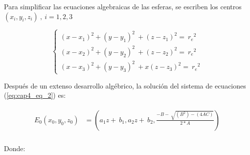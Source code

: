     \vspace{-3.5em}

    Para simplificar las ecuaciones algebraicas de las esferas, se escriben los centros $\left(x_i,y_i,z_i\right)\ ,\ i=1,2,3$
    
        \vspace{-1em}

    
    \begin{equation}
    \left\lbrace
    \begin{array}{ll}
    {\left(x-x_1\right)}^2+{\left(y-y_1\right)}^2\ +{\left(z-z_1\right)}^2=\ {r_e}^2\  \\ 
    {\left(x-x_2\right)}^2+{\left(y-y_2\right)}^2\ +{\left(z-z_2\right)}^2=\ {r_e}^2 \\ 
    {\left(x-x_3\right)}^2+{\left(y-y_3\right)}^2\ +{x\left(z-z_3\right)}^2=\ {r_e}^2
    \end{array}
    \right.
    \label{eq:cap4_eq_2}
    \end{equation}


    Despu\'{e}s de un extenso desarrollo alg\'{e}brico, la soluci\'{o}n del sistema de ecuaciones  (\ref{eq:cap4_eq_2}) es:

    \vspace{-2.5em}

    \begin{align}
    \begin{split}
            E_0\left(x_0,y_0,z_0\right)&={} \left(a_1z+\ b_1,a_2z+\ b_2,\frac{-B-\ \sqrt{\left(B^2\right)-\left(4AC\right)}}{2*A}\right)\\
    \end{split}
    \label{eq:cap4_eq_3}
    \end{align}
    

    Donde:
    \vspace{-1.0em}
        
